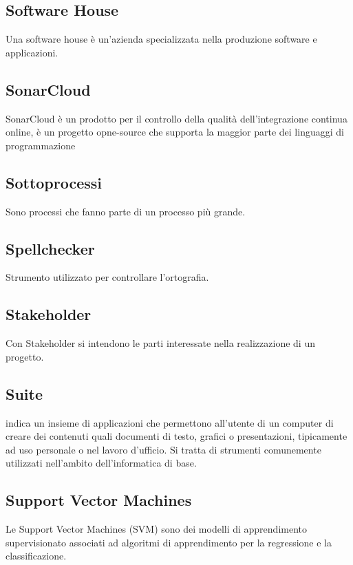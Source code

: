 \subsection*{Software House}
Una software house è un'azienda specializzata nella produzione software e applicazioni.

\subsection*{SonarCloud}
SonarCloud è un prodotto per il controllo della qualità dell'integrazione continua online, è un progetto opne-source che supporta la maggior parte dei linguaggi di programmazione

\subsection*{Sottoprocessi}
Sono processi che fanno parte di un processo più grande.

\subsection*{Spellchecker}
Strumento utilizzato per controllare l'ortografia.

\subsection*{Stakeholder}
Con Stakeholder si intendono le parti interessate nella realizzazione di un progetto.

\subsection*{Suite}
indica un insieme di applicazioni che permettono all'utente di un computer di creare dei contenuti quali documenti di testo, grafici o presentazioni, tipicamente ad uso personale o nel lavoro d'ufficio.
Si tratta di strumenti comunemente utilizzati nell'ambito dell'informatica di base.

\subsection*{Support Vector Machines}
Le Support Vector Machines (SVM) sono dei modelli di apprendimento supervisionato associati ad algoritmi di apprendimento per la regressione e la classificazione.

